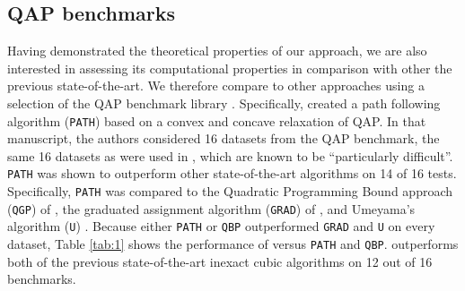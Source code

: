 \documentclass[10pt,journal,cspaper,compsoc]{IEEEtran}
\begin{document}


\subsection{QAP benchmarks}

Having demonstrated the theoretical properties of our approach, we are also interested in assessing its computational properties in comparison with other the previous state-of-the-art.  We therefore compare \faqap to other approaches using a selection of the QAP benchmark library \cite{Burkard1997}.  Specifically, \cite{Zaslavskiy2009} created a path following algorithm (\texttt{PATH}) based on a convex and concave relaxation of QAP.  In that manuscript, the authors considered 16 datasets from the QAP benchmark, the same 16 datasets as were used in \cite{Schellewald2001}, which are known to be ``particularly difficult''.  \texttt{PATH} was shown to outperform other state-of-the-art algorithms on 14 of 16 tests.  Specifically, \texttt{PATH} was compared to the Quadratic Programming Bound approach (\texttt{QGP}) of \cite{Anstreicher2001}, the graduated assignment algorithm (\texttt{GRAD}) of \cite{Gold1996}, and Umeyama's algorithm (\texttt{U}) \cite{Umeyama1988}.  Because either \texttt{PATH} or \texttt{QBP} outperformed \texttt{GRAD} and \texttt{U} on every dataset, Table \ref{tab:1} shows the performance of \faqap versus \texttt{PATH} and \texttt{QBP}.  \faqap outperforms both of the previous state-of-the-art inexact cubic algorithms on 12 out of 16 benchmarks.
\end{document}

